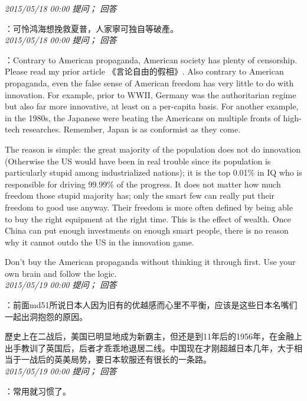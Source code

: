 \documentclass[twocolumn]{ctexart}
\begin{document}
\textit{\hfill\noindent\small 2015/05/18 00:00 提问； 回答}

：可怜鸿海想挽救夏普，人家寧可独自等破產。\\

\textit{\hfill\noindent\small 2015/05/18 00:00 提问； 回答}

：Contrary to American propaganda, American society has plenty of censorship. Please read my prior article 《言论自由的假相》. Also contrary to American propaganda, even the false sense of American freedom has very little to do with innovation. For example, prior to WWII, Germany was the authoritarian regime but also far more innovative, at least on a per-capita basis. For another example, in the 1980s, the Japanese were beating the Americans on multiple fronts of high-tech researches. Remember, Japan is as conformist as they come.

The reason is simple: the great majority of the population does not do innovation (Otherwise the US would have been in real trouble since its population is particularly stupid among industrialized nations); it is the top 0.01\% in IQ who is responsible for driving 99.99\% of the progress. It does not matter how much freedom those stupid majority has; only the smart few can really put their freedom to good use anyway. Their freedom is more often defined by being able to buy the right equipment at the right time. This is the effect of wealth. Once China can put enough investments on enough smart people, there is no reason why it cannot outdo the US in the innovation game.

Don't buy the American propaganda without thinking it through first. Use your own brain and follow the logic.\\

\textit{\hfill\noindent\small 2015/05/19 00:00 提问； 回答}

：前面md51所说日本人因为旧有的优越感而心里不平衡，应该是这些日本名嘴们一起出洞抱怨的原因。

歷史上在二战后，美国已明显地成为新霸主，但还是到11年后的1956年，在金融上出手教训了英国后，后者才乖乖地退居二线。中国现在才刚超越日本几年，大于相当于一战后的英美局势，要日本软服还有很长的一条路。\\

\textit{\hfill\noindent\small 2015/05/19 00:00 提问； 回答}

：常用就习惯了。\\
\end{document}
